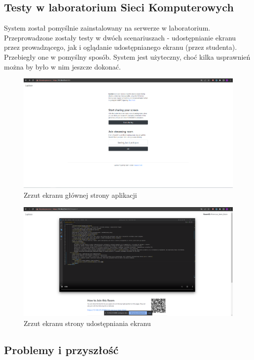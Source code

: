 \documentclass[a4paper,11pt]{article}
\begin{document}
        \subsection{Testy w laboratorium Sieci Komputerowych}
        System został pomyślnie zainstalowany na serwerze w laboratorium. 
        Przeprowadzone zostały testy w dwóch scenariuszach - udostępnianie ekranu przez prowadzącego, jak i oglądanie udostępnianego ekranu (przez studenta).
        Przebiegły one w pomyślny sposób. System jest użyteczny, choć kilka usprawnień można by było w nim jeszcze dokonać.
        \begin{figure}[H]
            \caption{Zrzut ekranu głównej strony aplikacji}
            \includegraphics[width=1\textwidth]{glowna_strona.png}
        \end{figure}
        \begin{figure}[H]
            \caption{Zrzut ekranu strony udostępniania ekranu}
            \includegraphics[width=1\textwidth]{strona_udostepniania.png}
        \end{figure}
        \subsection{Problemy i przyszłość}
\end{document}
